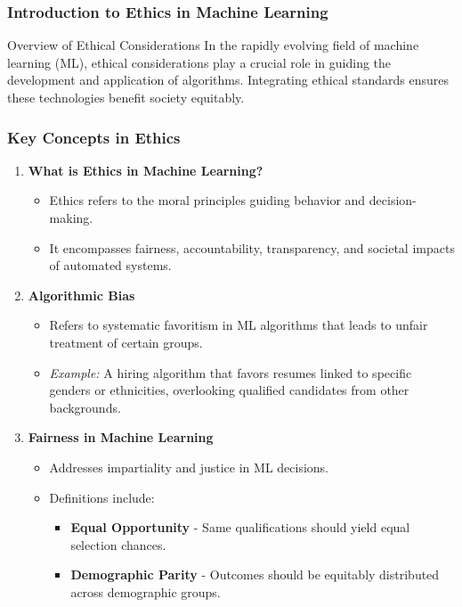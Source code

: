 \documentclass[aspectratio=169]{beamer}
\begin{document}
\frame{\titlepage}

\begin{frame}[fragile]
    \frametitle{Introduction to Ethics in Machine Learning}
    \begin{block}{Overview of Ethical Considerations}
        In the rapidly evolving field of machine learning (ML), ethical considerations play a crucial role in guiding the development and application of algorithms. Integrating ethical standards ensures these technologies benefit society equitably.
    \end{block}
\end{frame}

\begin{frame}[fragile]
    \frametitle{Key Concepts in Ethics}
    \begin{enumerate}
        \item \textbf{What is Ethics in Machine Learning?}
        \begin{itemize}
            \item Ethics refers to the moral principles guiding behavior and decision-making.
            \item It encompasses fairness, accountability, transparency, and societal impacts of automated systems.
        \end{itemize}
        
        \item \textbf{Algorithmic Bias}
        \begin{itemize}
            \item Refers to systematic favoritism in ML algorithms that leads to unfair treatment of certain groups.
            \item \textit{Example:} A hiring algorithm that favors resumes linked to specific genders or ethnicities, overlooking qualified candidates from other backgrounds.
        \end{itemize}

        \item \textbf{Fairness in Machine Learning}
        \begin{itemize}
            \item Addresses impartiality and justice in ML decisions.
            \item Definitions include:
                \begin{itemize}
                    \item \textbf{Equal Opportunity} - Same qualifications should yield equal selection chances.
                    \item \textbf{Demographic Parity} - Outcomes should be equitably distributed across demographic groups.
                \end{itemize}
        \end{itemize}
    \end{enumerate}
\end{frame}
\end{document}
